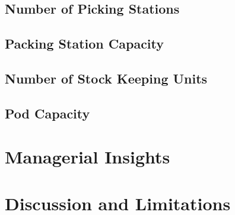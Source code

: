 \subsection{Number of Picking Stations}
\label{sec:exp-stations}

\subsection{Packing Station Capacity}
\label{sec:exp-capacity}

\subsection{Number of Stock Keeping Units}
\label{sec:exp-sku}

\subsection{Pod Capacity}
\label{sec:exp-podcapacity}

\section{Managerial Insights}
\label{sec:exp-insights}

\section{Discussion and Limitations}
\label{sec:exp-discussion}

